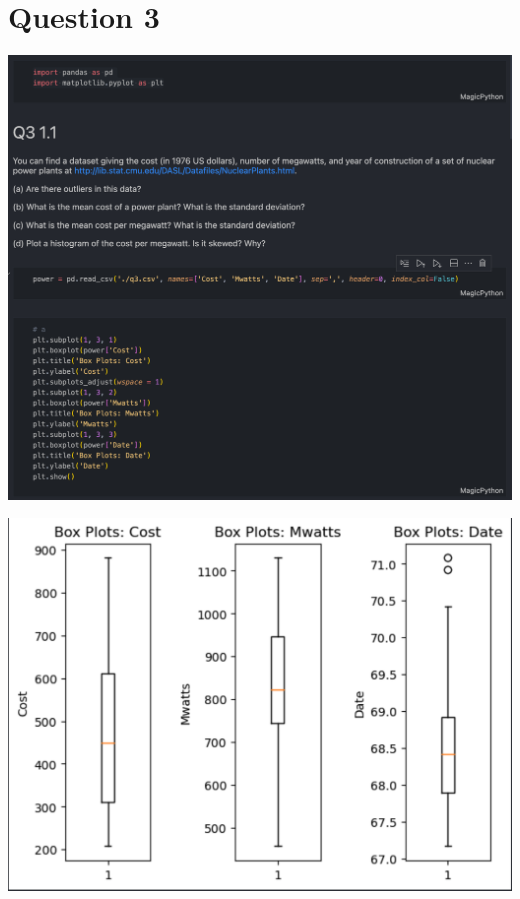 \documentclass{report}
\begin{document}
\section*{Question 3}
{
\centering
\includegraphics[scale=0.3]{q3a.png} 

\includegraphics[scale=0.3]{q3a_plot.png}
\par
}
\end{document}
